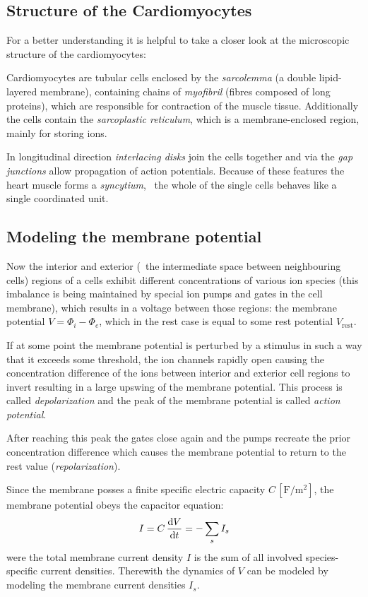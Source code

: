 \subsection{Structure of the Cardiomyocytes}
For a better understanding it is helpful to take a closer look at the
microscopic structure of the cardiomyocytes:

Cardiomyocytes are tubular cells enclosed by the \emph{sarcolemma} (a double
lipid-layered membrane), containing chains of \emph{myofibril} (fibres composed
of long proteins), which are responsible for contraction of the muscle tissue.
Additionally the cells contain the \emph{sarcoplastic reticulum}, which is a
membrane-enclosed region, mainly for storing  ions.

In longitudinal direction \emph{interlacing disks} join the cells together
and via the \emph{gap junctions} allow propagation of action potentials.
Because of these features the heart muscle forms a \emph{syncytium}, \ie~the
whole of the single cells behaves like a single coordinated unit.


\subsection{Modeling the membrane potential}
Now the interior and exterior (\ie~the intermediate space between
neighbouring cells) regions of a cells exhibit different concentrations of
various ion species (this imbalance is being maintained by special ion
pumps and gates in the cell membrane), which results in a voltage between
those regions: the membrane potential $V=\Phi_i-\Phi_e$, which in the rest
case is equal to some rest potential $V_{\mathrm{rest}}$.

If at some point the membrane potential is perturbed by a stimulus in such
a way that it exceeds some threshold, the ion channels rapidly open causing
the concentration difference of the ions between interior and exterior
cell regions to invert resulting in a large upswing of the membrane
potential. This process is called \emph{depolarization} and the peak of the
membrane potential is called \emph{action potential}.

After reaching this peak the gates close again and the pumps recreate the
prior concentration difference which causes the membrane potential to
return to the rest value (\emph{repolarization}).

Since the membrane posses a finite specific electric capacity $C\,
[\si{\farad\per\metre\squared}]$,
the membrane potential obeys the capacitor equation:
\begin{equation}
    I=C\,\dv{V}{t}=-\sum_{s}I_{s}
    \label{eq:cap}
\end{equation}
were the total membrane current density $I$ is the sum of all involved
species-specific current densities.
Therewith the dynamics of $V$ can be modeled by modeling the
membrane current densities $I_s$.

